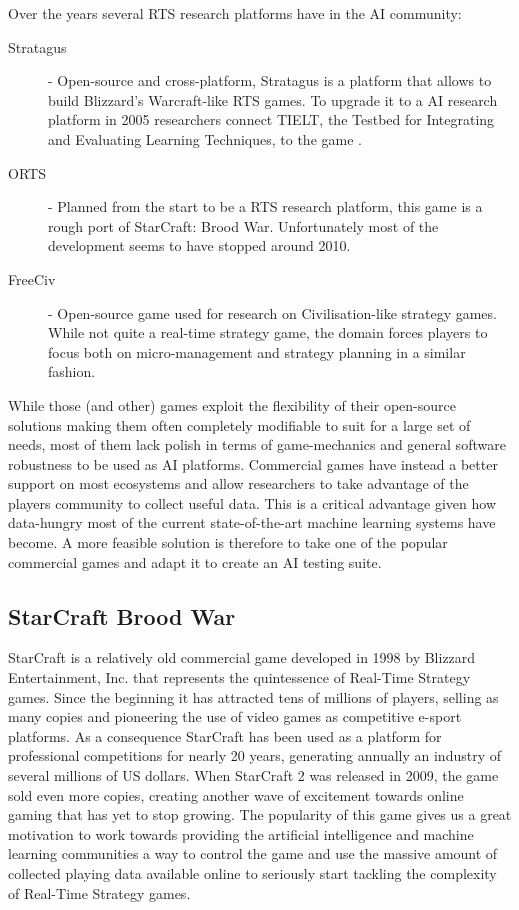 Over the years several RTS research platforms have in the AI community:

\begin{description}
\item [Stratagus \citep{ponsen2005stratagus}] - Open-source and cross-platform,
  Stratagus is a platform that allows to build Blizzard's Warcraft-like RTS
  games. To upgrade it to a AI research platform in 2005 researchers connect
  TIELT, the Testbed for Integrating and Evaluating Learning Techniques, to the
  game \citep{molineaux2005tielt}.
\item [ORTS \citep{buro2002orts}] - Planned from the start to be a RTS
  research platform, this game is a rough port of StarCraft: Brood War.
  Unfortunately most of the development seems to have stopped around 2010.
\item [FreeCiv \citep{houk2004strategic}] - Open-source game used for research
  on Civilisation-like strategy games. While not quite a real-time strategy
  game, the domain forces players to focus both on micro-management and strategy
  planning in a similar fashion.
\end{description} 

While those (and other) games exploit the flexibility of their open-source
solutions making them often completely modifiable to suit for a large set of
needs, most of them lack polish in terms of game-mechanics and general software
robustness to be used as AI platforms. Commercial games have instead a better
support on most ecosystems and allow researchers to take advantage of the
players community to collect useful data. This is a critical advantage given how
data-hungry most of the current state-of-the-art machine learning systems have
become. A more feasible solution is therefore to take one of the popular
commercial games and adapt it to create an AI testing suite.

\subsection{StarCraft Brood War}

StarCraft is a relatively old commercial game developed in 1998 by Blizzard
Entertainment, Inc. that represents the quintessence of Real-Time Strategy
games. Since the beginning it has attracted tens of millions of players, selling
as many copies and pioneering the use of video games as competitive e-sport
platforms. As a consequence StarCraft has been used as a platform for
professional competitions for nearly 20 years, generating annually an industry
of several millions of US dollars. When StarCraft 2 was released in 2009, the
game sold even more copies, creating another wave of excitement towards online
gaming that has yet to stop growing. The popularity of this game gives us a
great motivation to work towards providing the artificial intelligence and
machine learning communities a way to control the game and use the massive
amount of collected playing data available online to seriously start tackling
the complexity of Real-Time Strategy games.

